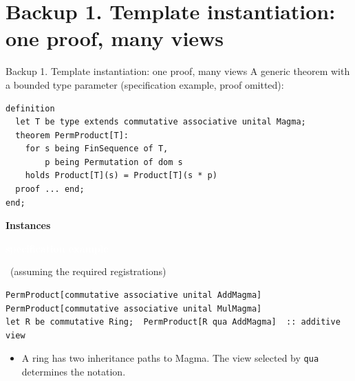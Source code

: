 \documentclass[aspectratio=169,11pt]{beamer}
\newcommand{\statusbadge}[2]{\colorbox{#1}{\textcolor{white}{\strut\scriptsize\sffamily\bfseries #2}}}
\newcommand{\badgeSpec}{\statusbadge{green!35!black}{specification example}}
\begin{document}
\appendix
\section{Backup 1. Template instantiation: one proof, many views}
\begin{frame}[fragile,t]{Backup 1. Template instantiation: one proof, many views}
A generic theorem with a bounded type parameter (specification example, proof omitted):

\begin{lstlisting}[language={mizar},basicstyle=\ttfamily\footnotesize]
definition
  let T be type extends commutative associative unital Magma;
  theorem PermProduct[T]:
    for s being FinSequence of T,
        p being Permutation of dom s
    holds Product[T](s) = Product[T](s * p)
  proof ... end;
end;
\end{lstlisting}
\smallskip
\textbf{Instances}~\badgeSpec~{\footnotesize(assuming the required registrations)}
\begin{lstlisting}[language={mizar},basicstyle=\ttfamily\small]
PermProduct[commutative associative unital AddMagma]
PermProduct[commutative associative unital MulMagma]
let R be commutative Ring;  PermProduct[R qua AddMagma]  :: additive view
\end{lstlisting}
\begin{itemize}
\setlength{\itemsep}{1pt}
\setlength{\parsep}{0pt}
\setlength{\parskip}{0pt}
\item A ring has two inheritance paths to Magma. The view selected by \texttt{qua} determines the notation.
\end{itemize}
\end{frame}
\end{document}
